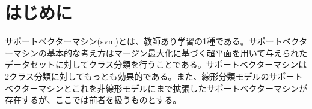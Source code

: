 \section{はじめに}
サポートベクターマシン(svm)とは、教師あり学習の1種である。サポートベクターマシンの基本的な考え方はマージン最大化に基づく超平面を用いて与えられたデータセットに対してクラス分類を行うことである。サポートベクターマシンは2クラス分類に対してもっとも効果的である。また、線形分類モデルのサポートベクターマシンとこれを非線形モデルにまで拡張したサポートベクターマシンが存在するが、ここでは前者を扱うものとする。

